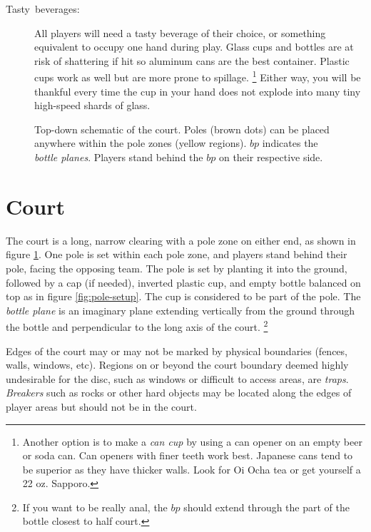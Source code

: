 \documentclass[11pt,letterpaper,twocolumn,english,DIV=calc]{scrartcl}
\begin{document}
\begin{description}
	\item [{Tasty~beverages:}] 
		All players will need a tasty beverage of their choice, or something equivalent to occupy one hand during play. 
		Glass cups and bottles are at risk of shattering if hit so aluminum cans are the best container. 
		Plastic cups work as well but are more prone to spillage.%
		\footnote{Another option is to make a \emph{can cup} by using a can opener on an empty beer or soda can. 
		Can openers with finer teeth work best.
		Japanese cans tend to be superior as they have thicker walls. 
		Look for Oi Ocha tea or get yourself a 22 oz. Sapporo.} 
		Either way, you will be thankful every time the cup in your hand does not explode into many tiny high-speed shards of glass.
\end{description}

\begin{figure}[!t]
	\begin{centering}
		\vspace{-5mm}\par
	\end{centering}
	\caption{
		Top-down schematic of the court. 
		Poles (brown dots) can be placed anywhere within the pole zones (yellow regions). 
		$bp$ indicates the \emph{bottle planes}. 
		Players stand behind the $bp$ on their respective side.\label{fig:court}
	}
\end{figure}


\part*{Court}

The court is a long, narrow clearing with a pole zone on either end, as shown in figure \ref{fig:court}. 
One pole is set within each pole zone, and players stand behind their pole, facing the opposing team.
The pole is set by planting it into the ground, followed by a cap (if needed), inverted plastic cup, and empty bottle balanced on top as in figure \ref{fig:pole-setup}. 
The cup is considered to be part of the pole. 
The \emph{bottle plane} is an imaginary plane extending vertically from the ground through the bottle and perpendicular to the long axis of the court.%
\footnote{If you want to be really anal, the $bp$ should extend through the part of the bottle closest to half court.}

Edges of the court may or may not be marked by physical boundaries (fences, walls, windows, etc). 
Regions on or beyond the court boundary deemed highly undesirable for the disc, such as windows or difficult to access areas, are \emph{traps}. 
\emph{Breakers} such as rocks or other hard objects may be located along the edges of player areas but should not be in the court.
\end{document}
